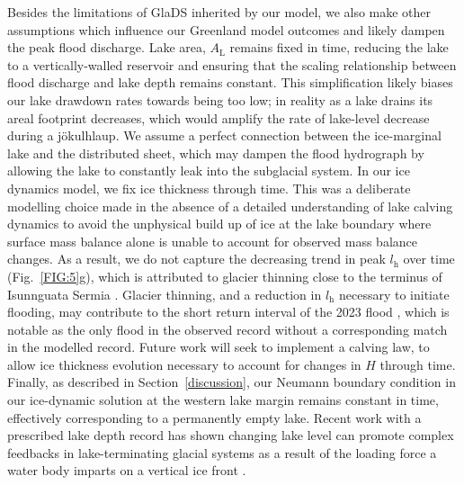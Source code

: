 \documentclass[tc, manuscript]{copernicus}
\begin{document}
Besides the limitations of GlaDS inherited by our model, we also make other assumptions which influence our Greenland model outcomes and likely dampen the peak flood discharge. Lake area, $A_{\mathrm{L}}$ remains fixed in time, reducing the lake to a vertically-walled reservoir and ensuring that the scaling relationship between flood discharge and lake depth remains constant. This simplification likely biases our lake drawdown rates towards being too low; in reality as a lake drains its areal footprint decreases, which would amplify the rate of lake-level decrease during a jökulhlaup. We assume a perfect connection between the ice-marginal lake and the distributed sheet, which may dampen the flood hydrograph by allowing the lake to constantly leak into the subglacial system. In our ice dynamics model, we fix ice thickness through time. This was a deliberate modelling choice made in the absence of a detailed understanding of lake calving dynamics to avoid the unphysical build up of ice at the lake boundary where surface mass balance alone is unable to account for observed mass balance changes. As a result, we do not capture the decreasing trend in peak $l_{\mathrm{h}}$ over time (Fig.~\ref{FIG:5}g), which is attributed to glacier thinning close to the terminus of Isunnguata Sermia \citep{livingstone2025ice}. Glacier thinning, and a reduction in $l_{\mathrm{h}}$ necessary to initiate flooding, may contribute to the short return interval of the 2023 flood \citep{livingstone2025ice}, which is notable as the only flood in the observed record without a corresponding match in the modelled record. Future work will seek to implement a calving law, to allow ice thickness evolution necessary to account for changes in $H$ through time. Finally, as described in Section~\ref{discussion}, our Neumann boundary condition in our ice-dynamic solution at the western lake margin remains constant in time, effectively corresponding to a permanently empty lake. Recent work with a prescribed lake depth record has shown changing lake level can promote complex feedbacks in lake-terminating glacial systems as a result of the loading force a water body imparts on a vertical ice front \citep{pramanik2026modelling}. 
\end{document}
